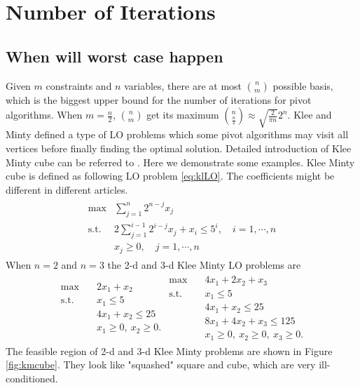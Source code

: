 \documentclass[11pt]{article}
\begin{document}
\section{Number of Iterations}
\subsection{When will worst case happen}
Given $m$ constraints and $n$ variables, there are at most $\binom{n}{m}$ possible basis, which is the biggest upper bound for the number of iterations for pivot algorithms. When $m=\frac{n}{2}$, $\binom{n}{m}$ get its maximum $\binom{n}{\frac{n}{2}}\approx \sqrt{\frac{2}{\pi n}}2^n$. Klee and Minty defined a type of LO problems which some pivot algorithms may visit all vertices before finally finding the optimal solution. Detailed introduction of Klee Minty cube can be referred to \cite{vanderbei2020linear}. Here we demonstrate some examples. Klee Minty cube is defined as following LO problem \ref{eq:klLO}. The coefficients might be different in different articles. 
\begin{align}
\begin{split}
\max &\sum_{j=1}^n 2^{n-j}x_j \\
\text{s.t. } & 2\sum_{j=1}^{i-1}2^{i-j}x_j + x_i \le 5^i, \quad i=1,\cdots,n\\
			&x_j \ge 0,  \quad j=1,\cdots,n
\end{split}\label{eq:klLO}
\end{align} 
When $n=2$ and $n=3$ the 2-d and 3-d Klee Minty LO problems are 
\begin{align*}
\begin{split}
\max \quad & 2x_1 + x_2 \\
\text{s.t. }\quad  & x_1 \le 5\\
& 4x_1 + x_2 \le 25\\
& x_1 \ge 0,\ x_2 \ge 0.
\end{split}
\begin{split}
\max \quad & 4x_1 + 2x_2 + x_3 \\
\text{s.t. }\quad  & x_1 \le 5\\
& 4x_1 + x_2 \le 25\\
& 8x_1 + 4x_2 + x_3 \le 125\\
& x_1 \ge 0,\ x_2 \ge 0, \ x_3 \ge 0.
\end{split}
\end{align*}
The feasible region of 2-d and 3-d Klee Minty problems are shown in Figure \ref{fig:kmcube}. They look like "squashed" square and cube, which are very ill-conditioned.
\end{document}
